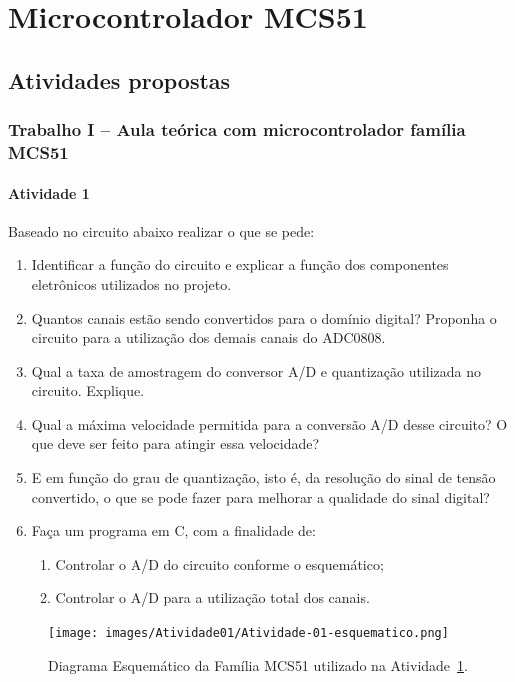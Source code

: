 \documentclass[
	12pt,				%
	openright,			%
  oneside,     %
	a4paper,			%
	english,			%
	french,				%
	spanish,			%
	brazil				%
	]{abntex2}
\begin{document}
\chapter{Microcontrolador MCS51} %
\label{cha:1-Familia-MCS51}

\section{Atividades propostas} %
\label{sec:atividades_propostas}

\subsection*{Trabalho I – Aula teórica com microcontrolador família MCS51}

\subsubsection*{Atividade 1}

\noindent Baseado no circuito abaixo realizar o que se pede:

\begin{enumerate}
  \item Identificar a função do circuito e explicar a função dos componentes eletrônicos utilizados no projeto.
  \item Quantos canais estão sendo convertidos para o domínio digital? Proponha o circuito para a utilização dos demais canais do ADC0808.
  \item Qual a taxa de amostragem do conversor A/D e quantização utilizada no circuito. Explique.
  \item Qual a máxima velocidade permitida para a conversão A/D desse circuito? O que deve ser feito para atingir essa velocidade?
  \item E em função do grau de quantização, isto é, da resolução do sinal de tensão convertido, o que se pode fazer para melhorar a qualidade do sinal digital?
  \item Faça um programa em C, com a finalidade de:
  \begin{enumerate}
    \item Controlar o A/D do circuito conforme o esquemático;
    \item Controlar o A/D para a utilização total dos canais.
  \end{enumerate}
\end{enumerate}

\begin{figure}[ht]
  \centering
  \caption{\label{fig:Atividade-01-esquematico.png}Diagrama Esquemático da Família MCS51 utilizado na Atividade~\ref{cha:1-Familia-MCS51}.}
  \texttt{[image: images/Atividade01/Atividade-01-esquematico.png]}
\end{figure}
\end{document}
